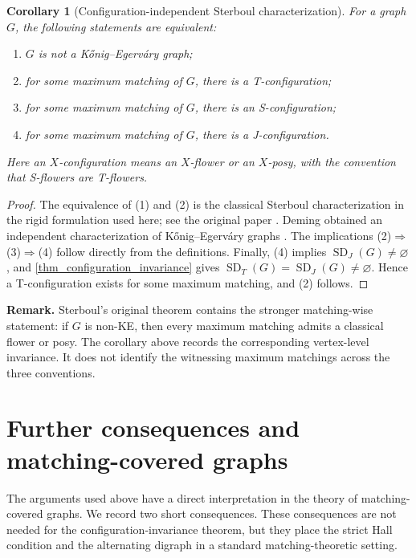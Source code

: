 \documentclass[preprint,12pt]{elsarticle}
\theoremstyle{plain}
\newtheorem{corollary}[theorem]{Corollary}
\newcommand{\SD}{\operatorname{SD}}
\begin{document}
\begin{corollary}[Configuration-independent Sterboul characterization]
\label{cor_configuration_independent_sterboul}
For a graph \(G\), the following statements are equivalent:
\begin{enumerate}[label=(\roman*)]
\item \(G\) is not a K\H{o}nig--Egerv\'{a}ry graph;
\item for some maximum matching of \(G\), there is a T-configuration;
\item for some maximum matching of \(G\), there is an S-configuration;
\item for some maximum matching of \(G\), there is a J-configuration.
\end{enumerate}
Here an \(X\)-configuration means an \(X\)-flower or an \(X\)-posy, with the
convention that S-flowers are T-flowers.
\end{corollary}

\begin{proof}
The equivalence of (1) and (2) is the classical Sterboul characterization
in the rigid formulation used here; see the original paper
\cite{sterboul1979characterization}. Deming obtained an independent
characterization of K\H{o}nig--Egerv\'{a}ry graphs
\cite{deming1979independence}.  The implications
(2)\(\Rightarrow\)(3)\(\Rightarrow\)(4) follow directly from the definitions.
Finally, (4) implies \(\SD_J(G)\neq\varnothing\), and
\cref{thm_configuration_invariance} gives
\(\SD_T(G)=\SD_J(G)\neq\varnothing\).  Hence a T-configuration exists for
some maximum matching, and (2) follows.
\end{proof}

\medskip
\noindent\textbf{Remark.}
Sterboul's original theorem contains the stronger matching-wise statement:
if \(G\) is non-KE, then every maximum matching admits a classical flower or
posy.  The corollary above records the corresponding vertex-level invariance.
It does not identify the witnessing maximum matchings across the three
conventions.
\medskip

\section{Further consequences and matching-covered graphs}\label{sec_applications}

The arguments used above have a direct interpretation in the theory of
matching-covered graphs.  We record two short consequences.  These consequences are not needed for
the configuration-invariance theorem, but they place the strict Hall condition
and the alternating digraph in a standard matching-theoretic setting.
\end{document}
